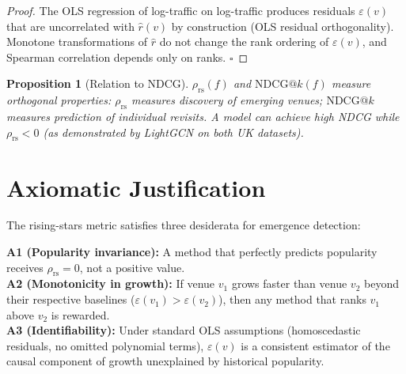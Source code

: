 \documentclass[11pt]{article}
\newtheorem{proposition}{Proposition}
\begin{document}
\begin{proof}
The OLS regression of log-traffic on log-traffic produces residuals $\varepsilon(v)$
that are uncorrelated with $\hat{r}(v)$ by construction (OLS residual orthogonality).
Monotone transformations of $\hat{r}$ do not change the rank ordering of $\varepsilon(v)$,
and Spearman correlation depends only on ranks. $\square$
\end{proof}

\begin{proposition}[Relation to NDCG]
$\rho_{\text{rs}}(f)$ and $\text{NDCG}@k(f)$ measure orthogonal properties:
$\rho_{\text{rs}}$ measures discovery of emerging venues;
$\text{NDCG}@k$ measures prediction of individual revisits.
A model can achieve high NDCG while $\rho_{\text{rs}} < 0$
(as demonstrated by LightGCN on both UK datasets).
\end{proposition}

\section{Axiomatic Justification}

The rising-stars metric satisfies three desiderata for emergence detection:

\textbf{A1 (Popularity invariance):} A method that perfectly predicts popularity
receives $\rho_{\text{rs}} = 0$, not a positive value. \\

\textbf{A2 (Monotonicity in growth):} If venue $v_1$ grows faster than venue $v_2$
beyond their respective baselines ($\varepsilon(v_1) > \varepsilon(v_2)$),
then any method that ranks $v_1$ above $v_2$ is rewarded. \\

\textbf{A3 (Identifiability):} Under standard OLS assumptions
(homoscedastic residuals, no omitted polynomial terms),
$\varepsilon(v)$ is a consistent estimator of the causal component of growth
unexplained by historical popularity.
\end{document}
